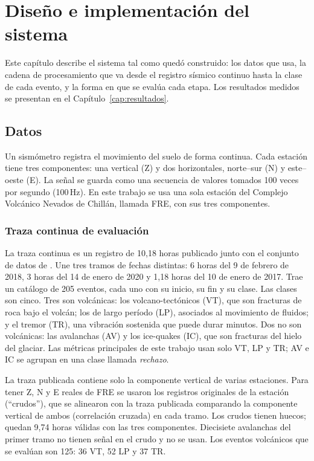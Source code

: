 \chapter{Diseño e implementación del sistema}
\label{cap:diseno}

Este capítulo describe el sistema tal como quedó construido: los datos que usa,
la cadena de procesamiento que va desde el registro sísmico continuo hasta la
clase de cada evento, y la forma en que se evalúa cada etapa. Los resultados
medidos se presentan en el Capítulo~\ref{cap:resultados}.

\section{Datos}
\label{sec:datos}

Un sismómetro registra el movimiento del suelo de forma continua. Cada
estación tiene tres componentes: una vertical (Z) y dos horizontales, norte--sur
(N) y este--oeste (E). La señal se guarda como una secuencia de valores tomados
100 veces por segundo (100\,Hz). En este trabajo se usa una sola estación del
Complejo Volcánico Nevados de Chillán, llamada FRE, con sus tres componentes.

\subsection{Traza continua de evaluación}
\label{subsec:traza}

La traza continua es un registro de 10,18 horas publicado junto con el
conjunto de datos de \textcite{espinosacurilem2025dataset}. Une tres tramos
de fechas distintas: 6 horas del 9 de febrero de 2018, 3 horas del 14 de enero
de 2020 y 1,18 horas del 10 de enero de 2017. Trae un catálogo de 205 eventos,
cada uno con su inicio, su fin y su clase. Las clases son cinco. Tres son
volcánicas: los volcano-tectónicos (VT), que son fracturas de roca bajo el
volcán; los de largo período (LP), asociados al movimiento de fluidos; y el
tremor (TR), una vibración sostenida que puede durar minutos. Dos no son
volcánicas: las avalanchas (AV) y los ice-quakes (IC), que son fracturas del
hielo del glaciar. Las métricas principales de este trabajo usan solo VT, LP y
TR; AV e IC se agrupan en una clase llamada \emph{rechazo}.

La traza publicada contiene solo la componente vertical de varias estaciones.
Para tener Z, N y E reales de FRE se usaron los registros originales de la
estación (``crudos''), que se alinearon con la traza publicada comparando la
componente vertical de ambos (correlación cruzada) en cada tramo. Los crudos
tienen huecos; quedan 9,74 horas válidas con las tres componentes. Diecisiete
avalanchas del primer tramo no tienen señal en el crudo y no se usan. Los
eventos volcánicos que se evalúan son 125: 36 VT, 52 LP y 37 TR.

